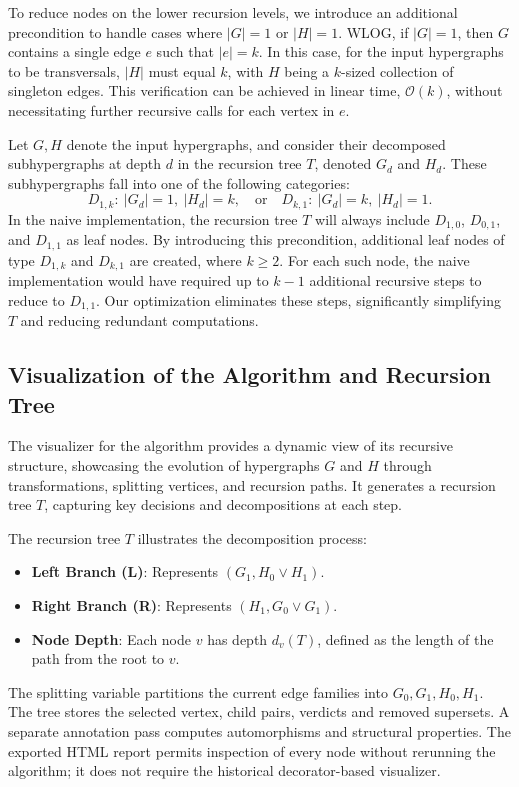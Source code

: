 To reduce nodes on the lower recursion levels, we introduce an additional precondition to handle cases where $|G|=1$ or $|H|=1$. WLOG, if $|G|=1$, then $G$ contains a single edge $e$ such that $|e|=k$. In this case, for the input hypergraphs to be transversals, $|H|$ must equal $k$, with $H$ being a $k$-sized collection of singleton edges. This verification can be achieved in linear time, $\mathcal{O}(k)$, without necessitating further recursive calls for each vertex in $e$.

Let $G,H$ denote the input hypergraphs, and consider their decomposed subhypergraphs at depth $d$ in the recursion tree $T$, denoted $G_d$ and $H_d$. These subhypergraphs fall into one of the following categories:
\[
D_{1,k}:\ |G_d|=1,\ |H_d|=k,\quad\text{or}\quad D_{k,1}:\ |G_d|=k,\ |H_d|=1.
\]
In the naive implementation, the recursion tree $T$ will always include $D_{1,0}$, $D_{0,1}$, and $D_{1,1}$ as leaf nodes. By introducing this precondition, additional leaf nodes of type $D_{1,k}$ and $D_{k,1}$ are created, where $k\geq 2$. For each such node, the naive implementation would have required up to $k-1$ additional recursive steps to reduce to $D_{1,1}$. Our optimization eliminates these steps, significantly simplifying $T$ and reducing redundant computations.

\subsection{Visualization of the\FKA{} Algorithm and Recursion Tree}

The visualizer for the\FKA{} algorithm provides a dynamic view of its recursive structure, showcasing the evolution of hypergraphs $G$ and $H$ through transformations, splitting vertices, and recursion paths. It generates a recursion tree $T$, capturing key decisions and decompositions at each step.

The recursion tree $T$ illustrates the decomposition process:
\begin{itemize}
\item \textbf{Left Branch (L)}: Represents $(G_1,H_0\vee H_1)$.
\item \textbf{Right Branch (R)}: Represents $(H_1,G_0\vee G_1)$.
\item \textbf{Node Depth}: Each node $v$ has depth $d_v(T)$, defined as the length of the path from the root to $v$.
\end{itemize}

The splitting variable partitions the current edge families into $G_0,G_1,H_0,H_1$.
The tree stores the selected vertex, child pairs, verdicts and removed supersets.
A separate annotation pass computes automorphisms and structural properties.
The exported HTML report permits inspection of every node without rerunning
the algorithm; it does not require the historical decorator-based visualizer.

